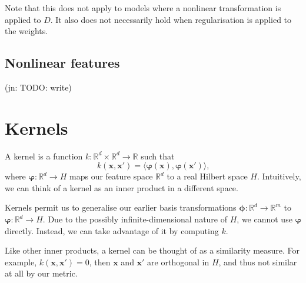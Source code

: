 \documentclass[11pt,twoside,openright]{report}
\newcommand\bphi{\bm{\phi}}
\newcommand\bvarphi{\bm{\varphi}}
\newcommand\bbR{\mathbb{R}}
\newcommand\bx{\mathbf{x}}
\newcommand\jn[1]{{\color{red}(jn: #1)}}
\begin{document}
Note that this does not apply to models where a nonlinear transformation is applied to $D$. It also does not necessarily hold when regularisation is applied to the weights.

\subsection{Nonlinear features}

\jn{TODO: write}

\section{Kernels}

A kernel is a function $k : \bbR^d \times \bbR^d \to \bbR$ such that \[
    k(\bx, \bx') = \langle \bvarphi\left(\bx\right), \bvarphi\left(\bx'\right)\rangle \text{,}
\] where $\bvarphi : \bbR^d \to H$ maps our feature space $\bbR^d$ to a real Hilbert space $H$. Intuitively, we can think of a kernel as an inner product in a different space.

Kernels permit us to generalise our earlier basis transformations $\bphi : \bbR^d \to \bbR^m$ to $\bvarphi : \bbR^d \to H$. Due to the possibly infinite-dimensional nature of $H$, we cannot use $\bvarphi$ directly. Instead, we can take advantage of it by computing $k$.

Like other inner products, a kernel can be thought of as a similarity measure. For example, $k(\bx, \bx') = 0$, then $\bx$ and $\bx'$ are orthogonal in $H$, and thus not similar at all by our metric.
\end{document}
